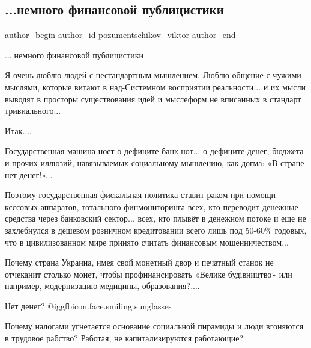 
 
 
 
 
 
\subsection{...немного финансовой публицистики}
\label{sec:18_10_2021.fb.pozumentschikov_viktor.1.finansy}
 
\ifcmt
 author_begin
   author_id pozumentschikov_viktor
 author_end
\fi

....немного финансовой публицистики

Я очень люблю людей с нестандартным мышлением. Люблю общение с чужими мыслями,
которые витают в над-Системном восприятии реальности... и их мысли выводят в
просторы существования идей и мыслеформ не вписанных в стандарт тривиального... 

Итак....

Государственная машина ноет о дефиците банк-нот... о дефиците денег, бюджета и
прочих иллюзий, навязываемых социальному мышлению, как догма: «В стране нет
денег!»...

Поэтому государственная фискальная политика ставит раком при помощи ксссовых
аппаратов, тотального финмониторинга всех, кто переводит денежные средства
через банковский сектор... всех, кто плывёт в денежном потоке и еще не
захлебнулся в дешевом розничном кредитовании всего лишь под 50-60\% годовых,
что в цивилизованном мире принято считать финансовым мошенничеством...

Почему страна Украина, имея свой монетный двор и печатный станок не отчеканит
столько монет, чтобы профинансировать «Велике будівництво» или например,
модернизацию медицины, образования?....

Нет денег? @igg{fbicon.face.smiling.sunglasses} 

Почему налогами угнетается основание социальной пирамиды и люди вгоняются в
трудовое рабство? Работая, не капитализируются работающие?

